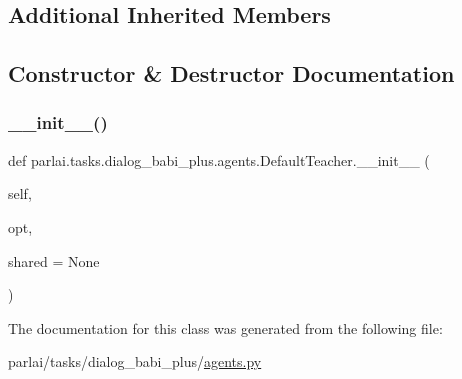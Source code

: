 \subsection*{Additional Inherited Members}


\subsection{Constructor \& Destructor Documentation}
\mbox{\label{classparlai_1_1tasks_1_1dialog__babi__plus_1_1agents_1_1DefaultTeacher_a672986e909678e098b1315a614611c32}} 
\subsubsection{\texorpdfstring{\+\_\+\+\_\+init\+\_\+\+\_\+()}{\_\_init\_\_()}}
{\footnotesize\ttfamily def parlai.\+tasks.\+dialog\+\_\+babi\+\_\+plus.\+agents.\+Default\+Teacher.\+\_\+\+\_\+init\+\_\+\+\_\+ (\begin{DoxyParamCaption}\item[{}]{self,  }\item[{}]{opt,  }\item[{}]{shared = {\ttfamily None} }\end{DoxyParamCaption})}



The documentation for this class was generated from the following file\+:\begin{DoxyCompactItemize}
\item 
parlai/tasks/dialog\+\_\+babi\+\_\+plus/\hyperlink{parlai_2tasks_2dialog__babi__plus_2agents_8py}{agents.\+py}\end{DoxyCompactItemize}
